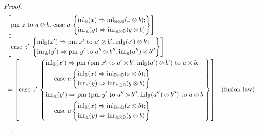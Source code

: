 \documentclass[10pt,a4paper]{amsart}
\theoremstyle{definition}
\theoremstyle{definition}
\theoremstyle{definition}
\theoremstyle{definition}
\theoremstyle{definition}
\theoremstyle{definition}
\begin{document}
\begin{proof}
\begin{align*}
  &\left[ \text{pm } z \text{ to } a \otimes b. \text{ case } a\, \left\{ \begin{aligned}
    &\mathrm{inl}_{\mathbb{B}}(x) \Rightarrow \mathrm{inl}_{\mathbb{B} \otimes \mathbb{D}}(x \otimes b);\\
    &\mathrm{inr}_{\mathbb{A}}(y) \Rightarrow \mathrm{inr}_{\mathbb{A} \otimes \mathbb{D}} (y \otimes b)
\end{aligned} \right\} \right] \\
 \cdot &   \left[ \text{case } z' \,  \left\{\begin{aligned} 
  &\mathrm{inl}_{\mathbb{B}}(x') \Rightarrow \text{pm } x' \text{ to } a' \otimes b'. \, \mathrm{inl}_{\mathbb{B}}(a') \otimes b';\\
  &\mathrm{inr}_{\mathbb{A}}(y') \Rightarrow \text{pm } y' \text{ to } a'' \otimes b''. \, \mathrm{inr}_{\mathbb{A}}(a'') \otimes b'' 
\end{aligned}  \right\}\right] \\
& =  \left[ \text{case } z' \,  
\left\{
  \begin{aligned} 
  &\mathrm{inl}_{\mathbb{B}}(x') \Rightarrow \text{pm }  (\text{pm } x' \text{ to } a' \otimes b'. \, \mathrm{inl}_{\mathbb{B}}(a') \otimes b')  \text{ to } a \otimes b . \\  
  & \hspace{10pt}\text{ case } a\, \Bigg\{ 
    \begin{aligned}
    & \mathrm{inl}_{\mathbb{B}}(x) \Rightarrow \mathrm{inl}_{\mathbb{B} \otimes \mathbb{D}}(x \otimes b);\\
    & \mathrm{inr}_{\mathbb{A}}(y) \Rightarrow \mathrm{inr}_{\mathbb{A} \otimes \mathbb{D}} (y \otimes b)
    \end{aligned} \Bigg\} \\
  &\mathrm{inr}_{\mathbb{A}}(y') \Rightarrow \text{pm }  (\text{pm } y' \text{ to } a'' \otimes b''. \, \mathrm{inl}_{\mathbb{B}}(a'') \otimes b'')  \text{ to } a \otimes b . \\ 
  & \hspace{10pt}\text{ case } a\, \Bigg\{ 
    \begin{aligned}
    & \mathrm{inl}_{\mathbb{B}}(x) \Rightarrow \mathrm{inl}_{\mathbb{B} \otimes \mathbb{D}}(x \otimes b);\\
    & \mathrm{inr}_{\mathbb{A}}(y) \Rightarrow \mathrm{inr}_{\mathbb{A} \otimes \mathbb{D}} (y \otimes b)
    \end{aligned} \Bigg\} \\ 
\end{aligned}  
\right\}\right] & (\text{fusion law}) \\
\end{align*}



\end{proof}




\newpage
 

\end{document}
